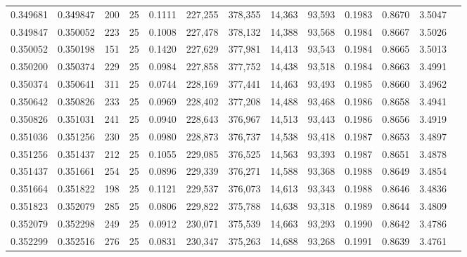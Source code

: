 \begin{tabular}{rrrrrrrrrrrrr}
0.349681 & 0.349847 &   200 &  25 &                                     0.1111 & 227,255 & 378,355 &  14,363 &  93,593 & 0.1983 & 0.8670 & 3.5047 \\
0.349847 & 0.350052 &   223 &  25 &                                     0.1008 & 227,478 & 378,132 &  14,388 &  93,568 & 0.1984 & 0.8667 & 3.5026 \\
0.350052 & 0.350198 &   151 &  25 &                                     0.1420 & 227,629 & 377,981 &  14,413 &  93,543 & 0.1984 & 0.8665 & 3.5013 \\
0.350200 & 0.350374 &   229 &  25 &                                     0.0984 & 227,858 & 377,752 &  14,438 &  93,518 & 0.1984 & 0.8663 & 3.4991 \\
0.350374 & 0.350641 &   311 &  25 &                                     0.0744 & 228,169 & 377,441 &  14,463 &  93,493 & 0.1985 & 0.8660 & 3.4962 \\
0.350642 & 0.350826 &   233 &  25 &                                     0.0969 & 228,402 & 377,208 &  14,488 &  93,468 & 0.1986 & 0.8658 & 3.4941 \\
0.350826 & 0.351031 &   241 &  25 &                                     0.0940 & 228,643 & 376,967 &  14,513 &  93,443 & 0.1986 & 0.8656 & 3.4919 \\
0.351036 & 0.351256 &   230 &  25 &                                     0.0980 & 228,873 & 376,737 &  14,538 &  93,418 & 0.1987 & 0.8653 & 3.4897 \\
0.351256 & 0.351437 &   212 &  25 &                                     0.1055 & 229,085 & 376,525 &  14,563 &  93,393 & 0.1987 & 0.8651 & 3.4878 \\
0.351437 & 0.351661 &   254 &  25 &                                     0.0896 & 229,339 & 376,271 &  14,588 &  93,368 & 0.1988 & 0.8649 & 3.4854 \\
0.351664 & 0.351822 &   198 &  25 &                                     0.1121 & 229,537 & 376,073 &  14,613 &  93,343 & 0.1988 & 0.8646 & 3.4836 \\
0.351823 & 0.352079 &   285 &  25 &                                     0.0806 & 229,822 & 375,788 &  14,638 &  93,318 & 0.1989 & 0.8644 & 3.4809 \\
0.352079 & 0.352298 &   249 &  25 &                                     0.0912 & 230,071 & 375,539 &  14,663 &  93,293 & 0.1990 & 0.8642 & 3.4786 \\
0.352299 & 0.352516 &   276 &  25 &                                     0.0831 & 230,347 & 375,263 &  14,688 &  93,268 & 0.1991 & 0.8639 & 3.4761 \\

\end{tabular}
